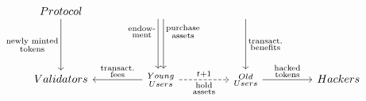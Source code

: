 \documentclass[../Paper/main.tex]{subfiles}
\begin{document}
\begin{equation}
    \label{fig:tikz-b}
    \begin{tikzcd}[ampersand replacement=\&, column sep = 4.5em, row sep = 4.5em]
    Protocol 
    \ar[d, "\substack{\text{newly minted}\\\text{tokens}}" ']
    \&
    \ar[d, shift right, "\substack{\text{endow-}\\ \text{ment}}" 'near start]
    \ar[d, shift left, "\substack{\text{purchase}\\ \text{assets}}" near start]
    \&
    \ar[d, "\substack{\text{transact.}\\ \text{benefits}}" ]
    \&
    \\
    Validators
    \& 
    \substack{Young\\Users}
    \ar[l,"\substack{\text{transact.}\\ \text{fees}}" ']
    \ar[r, dashed, "t+1", 
    "\substack{\text{hold}\\\text{assets}}" ']
    \& 
    \substack{Old\\Users}
    \ar[r, "\substack{\text{hacked}\\ \text{tokens}}"]
    \&
    Hackers
    \end{tikzcd}
\end{equation}
\end{document}
